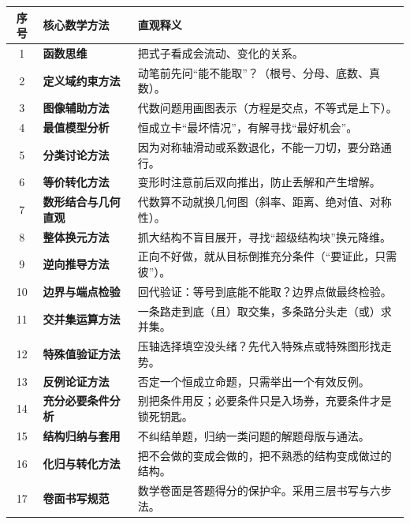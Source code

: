 \documentclass[11pt,a4paper]{ctexart}
\begin{document}
\begingroup
\renewcommand{\arraystretch}{1.5}
\linespread{1.3}\selectfont
{}
\begin{longtable}{clp{13.2cm}}
\toprule[1.2pt]
\textbf{序号} & \textbf{核心数学方法} & \textbf{直观释义} \\
\midrule
\endhead
1 & \textbf{函数思维} & 把式子看成会流动、变化的关系。 \\ \hline
2 & \textbf{定义域约束方法} & 动笔前先问“能不能取”？（根号、分母、底数、真数）。 \\ \hline
3 & \textbf{图像辅助方法} & 代数问题用画图表示（方程是交点，不等式是上下）。 \\ \hline
4 & \textbf{最值模型分析} & 恒成立卡“最坏情况”，有解寻找“最好机会”。 \\ \hline
5 & \textbf{分类讨论方法} & 因为对称轴滑动或系数退化，不能一刀切，要分路通行。 \\ \hline
6 & \textbf{等价转化方法} & 变形时注意前后双向推出，防止丢解和产生增解。 \\ \hline
7 & \textbf{数形结合与几何直观} & 代数算不动就换几何图（斜率、距离、绝对值、对称性）。 \\ \hline
8 & \textbf{整体换元方法} & 抓大结构不盲目展开，寻找“超级结构块”换元降维。 \\ \hline
9 & \textbf{逆向推导方法} & 正向不好做，就从目标倒推充分条件（“要证此，只需彼”）。 \\ \hline
10 & \textbf{边界与端点检验} & 回代验证：等号到底能不能取？边界点做最终检验。 \\ \hline
11 & \textbf{交并集运算方法} & 一条路走到底（且）取交集，多条路分头走（或）求并集。 \\ \hline
12 & \textbf{特殊值验证方法} & 压轴选择填空没头绪？先代入特殊点或特殊图形找走势。 \\ \hline
13 & \textbf{反例论证方法} & 否定一个恒成立命题，只需举出一个有效反例。 \\ \hline
14 & \textbf{充分必要条件分析} & 别把条件用反；必要条件只是入场券，充要条件才是锁死钥匙。 \\ \hline
15 & \textbf{结构归纳与套用} & 不纠结单题，归纳一类问题的解题母版与通法。 \\ \hline
16 & \textbf{化归与转化方法} & 把不会做的变成会做的，把不熟悉的结构变成做过的结构。 \\ \hline
17 & \textbf{卷面书写规范} & 数学卷面是答题得分的保护伞。采用三层书写与六步法。 \\
\bottomrule[1.2pt]
\end{longtable}
\endgroup

\newpage
\end{document}
